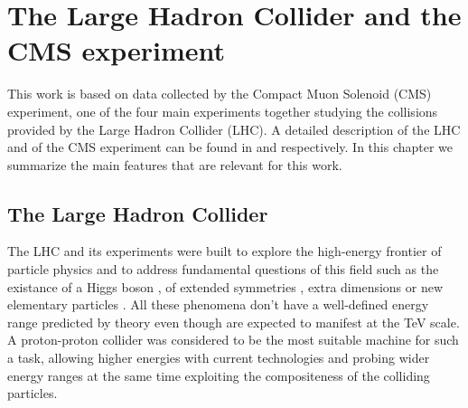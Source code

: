 \chapter{The Large Hadron Collider and the CMS experiment}
\label{sec:chap_2}

This work is based on data collected by the Compact Muon Solenoid (CMS) experiment, 
one of the four main experiments together studying the collisions 
provided by the Large Hadron Collider (LHC). A detailed description of the LHC and of the CMS 
experiment can be found in \cite{Evans:2006tq} and \cite{Chatrchyan:2008aa} respectively.
In this chapter we summarize the main features that are relevant for this work.

\section{The Large Hadron Collider}

The LHC and its experiments were built to explore the high-energy frontier of particle physics and to address fundamental questions of this field such as the existance of a Higgs boson \cite{Englert:1964et,Higgs:1964ia,Higgs:1964pj,Guralnik:1964eu,Higgs:1966ev,Kibble:1967sv}, of extended symmetries \cite{Martin:1997ns}, extra dimensions \cite{Antoniadis:1999bq} or new elementary particles \cite{Beltran:2010ww,Randall:1999vf}. All these phenomena don't have a well-defined energy range predicted by theory even though are expected to manifest at the TeV scale. A proton-proton collider was considered to be the most suitable machine for such a task, allowing higher energies with current technologies and probing wider energy ranges at the same time exploiting the compositeness of the colliding particles.


